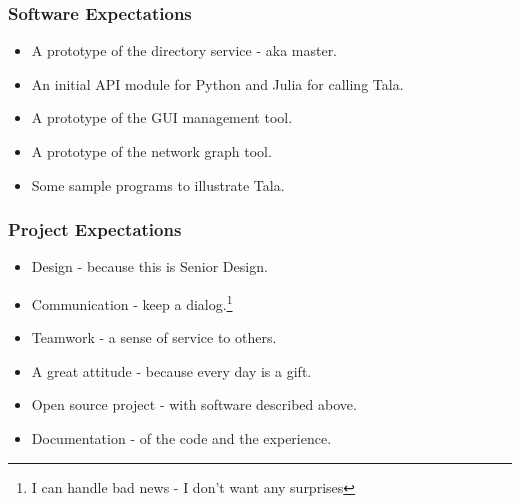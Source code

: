 \documentclass[xcolor=svgnames]{beamer}
\begin{document}
\begin{frame}[fragile]
  \frametitle{Software Expectations}

\begin{itemize}
\item A prototype of the directory service - aka master.
\item An initial API module for Python and Julia for calling Tala.
\item A prototype of the GUI management tool.
\item A prototype of the network graph tool.
\item Some sample programs to illustrate Tala.
\end{itemize}


\end{frame}


\begin{frame}[fragile]
  \frametitle{Project Expectations}

\begin{itemize}
\item Design - because this is Senior Design.
\item Communication - keep a dialog.\footnote{I can handle bad news - I don't want any surprises}
\item Teamwork - a sense of service to others.
\item A great attitude - because every day is a gift.
\item Open source project - with software described above.
\item Documentation - of the code and the experience.
\end{itemize}

\end{frame}
\end{document}
